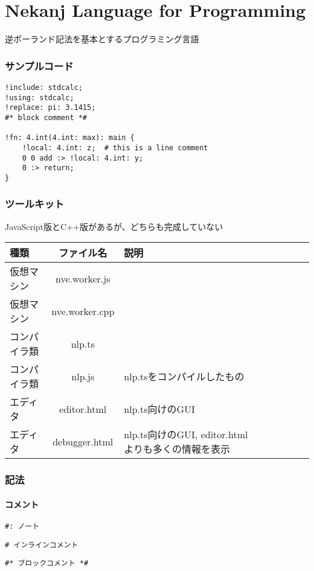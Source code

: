 \part{Nekanj Language for Programming}

逆ポーランド記法を基本とするプログラミング言語

\section{サンプルコード}
\begin{lstlisting}[]
!include: stdcalc;
!using: stdcalc;
!replace: pi: 3.1415;
#* block comment *#

!fn: 4.int(4.int: max): main {
    !local: 4.int: z;  # this is a line comment
    0 0 add :> !local: 4.int: y;
    0 :> return;
}
\end{lstlisting}

\section{ツールキット}
JavaScript版とC++版があるが、どちらも完成していない
\begin{table}[h]
    \centering
    \begin{tabular}{lcllllll}
        \hline
        種類 & ファイル名 & 説明 \\
        \hline \hline
        仮想マシン & nve.worker.js \\
        仮想マシン & nve.worker.cpp \\
        \hline
        コンパイラ類 & nlp.ts \\
        コンパイラ類 & nlp.js & nlp.tsをコンパイルしたもの \\
        \hline
        エディタ & editor.html & nlp.ts向けのGUI \\
        エディタ & debugger.html & nlp.ts向けのGUI, editor.htmlよりも多くの情報を表示 \\
        \hline
    \end{tabular}
\end{table}


\section{記法}

\subsection{コメント}
\begin{lstlisting}[]
#: ノート
\end{lstlisting}
\begin{lstlisting}[]
# インラインコメント
\end{lstlisting}
\begin{lstlisting}[]
#* ブロックコメント *#
\end{lstlisting}
